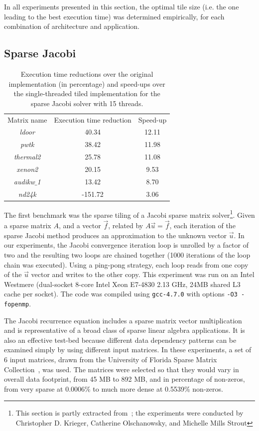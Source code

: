In all experiments presented in this section, the optimal tile size (i.e. the one leading to the best execution time) was determined empirically, for each combination of architecture and application. 

\subsection{Sparse Jacobi}

\begin{table}[t]
\centering
\begin{tabulary}{1.0\columnwidth}{c | c | c}
\hline
Matrix name & Execution time reduction & Speed-up  \\
{\em ldoor} & 40.34 & 12.11 \\
{\em pwtk} & 38.42 & 11.98 \\
{\em thermal2} & 25.78 & 11.08 \\
{\em xenon2} & 20.15 & 9.53 \\
{\em audikw$\_$1} & 13.42 & 8.70 \\
{\em nd24k} & -151.72 & 3.06 \\
\hline
\end{tabulary}
\caption{Execution time reductions over the original implementation (in percentage) and speed-ups over the single-threaded tiled implementation for the sparse Jacobi solver with 15 threads.}
\label{table:st-jacobi}
\end{table}

The first benchmark was the sparse tiling of a Jacobi sparse matrix solver\footnote{This section is partly extracted from~\cite{st-paper}; the experiments were conducted by Christopher D. Krieger, Catherine Olschanowsky, and Michelle Mills Strout}. Given a sparse matrix $A$, and a vector $\vec{f}$, related by $A\vec{u}=\vec{f}$, each iteration of the sparse Jacobi method produces an approximation to the unknown vector $\vec{u}$. In our experiments, the Jacobi convergence iteration loop is unrolled by a factor of two and the resulting two loops are chained together (1000 iterations of the loop chain was executed). Using a ping-pong strategy, each loop reads from one copy of the $\vec{u}$ vector and writes to the other copy. This experiment was run on an Intel Westmere (dual-socket 8-core Intel Xeon E7-4830 2.13 GHz, 24MB shared L3 cache per socket). The code was compiled using {\tt gcc-4.7.0} with options {\tt -O3 -fopenmp}.

The Jacobi recurrence equation includes a sparse matrix vector multiplication and is representative of a broad class of sparse linear algebra applications. It is also an effective test-bed because different data dependency patterns can be examined simply by using different input matrices. In these experiments, a set of 6 input matrices, drawn from the University of Florida Sparse Matrix Collection~\citep{ST-MatrixMarket}, was used. The matrices were selected so that they would vary in overall data footprint, from 45 MB to 892 MB, and in percentage of non-zeros, from very sparse at 0.0006\% to much more dense at 0.5539\% non-zeros. %

